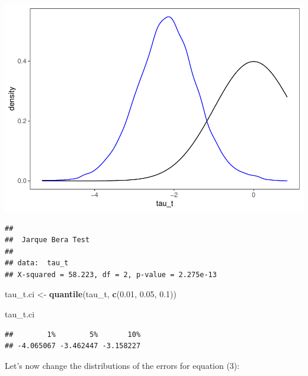 \documentclass[
]{article}
\newenvironment{Shaded}{\begin{snugshade}}{\end{snugshade}}
\newcommand{\CommentTok}[1]{\textcolor[rgb]{0.56,0.35,0.01}{\textit{#1}}}
\newcommand{\FloatTok}[1]{\textcolor[rgb]{0.00,0.00,0.81}{#1}}
\newcommand{\KeywordTok}[1]{\textcolor[rgb]{0.13,0.29,0.53}{\textbf{#1}}}
\newcommand{\NormalTok}[1]{#1}
\newcommand{\StringTok}[1]{\textcolor[rgb]{0.31,0.60,0.02}{#1}}
\begin{document}
\begin{center}\includegraphics{Econo2_P6_files/figure-latex/monte carlo 3-1} \end{center}

\begin{Shaded}
\end{Shaded}

\begin{verbatim}
## 
##  Jarque Bera Test
## 
## data:  tau_t
## X-squared = 58.223, df = 2, p-value = 2.275e-13
\end{verbatim}

\begin{Shaded}
\begin{Highlighting}[]
\NormalTok{tau_t.ci <-}\StringTok{ }\KeywordTok{quantile}\NormalTok{(tau_t, }\KeywordTok{c}\NormalTok{(}\FloatTok{0.01}\NormalTok{, }\FloatTok{0.05}\NormalTok{, }\FloatTok{0.1}\NormalTok{))}

\NormalTok{tau_t.ci}
\end{Highlighting}
\end{Shaded}

\begin{verbatim}
##        1%        5%       10% 
## -4.065067 -3.462447 -3.158227
\end{verbatim}

Let's now change the distributions of the errors for equation (3):
\end{document}
